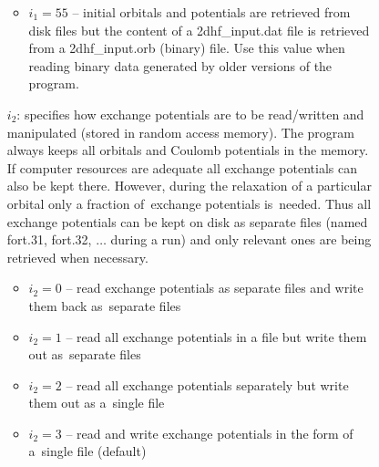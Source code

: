 \documentclass[12pt,a4paper]{article}
\begin{document}
\begin{description}
\begin{description}
\begin{itemize}
\begin{itemize}
\item $i_1=55$ -- initial orbitals and potentials are retrieved from disk files but the
  content of a 2dhf\_input.dat file is retrieved from a 2dhf\_input.orb (binary) file. Use
  this value when reading binary data generated by older versions of the program.

\end{itemize}

\item[$i_2$:] specifies how exchange potentials are to be read/written and manipulated
  (stored in random access memory). The program always keeps all orbitals and Coulomb
  potentials in the memory. If computer resources are adequate all exchange potentials can
  also be kept there. However, during the relaxation of a particular orbital only a
  fraction of~exchange potentials is~needed. Thus all exchange potentials can be kept on
  disk as separate files (named fort.31, fort.32, $\ldots$ during a run) and only relevant
  ones are being retrieved when necessary.
\begin{itemize}
\item $i_2=0$ -- read exchange potentials as separate files and
                      write them back as~separate files
\item $i_2=1$ -- read all exchange potentials in a file but write
                       them out as~separate files
\item $i_2=2$ -- read all exchange potentials separately but write
                    them out as a~single file
\item $i_2=3$ -- read and write exchange potentials in the form of
                    a~single file (default)
\end{itemize}


\end{itemize}
\end{description}
\end{description}
\end{document}
